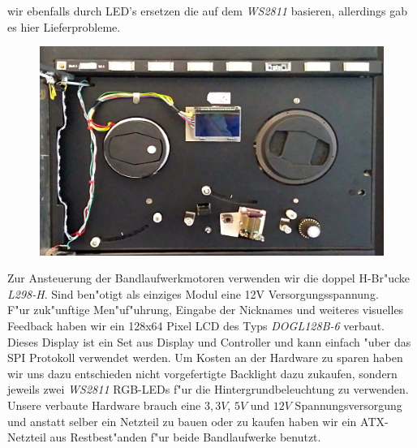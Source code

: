 \documentclass[a4paper]{article}
\begin{document}
    wir ebenfalls durch LED's ersetzen die auf dem \textit{WS2811} basieren,
    allerdings gab es hier Lieferprobleme.\\
    \begin{figure}
      \centering
      \label{figure:Bandlaufwerke}
      \includegraphics[scale=0.075]{Frontansicht.jpg}
    \end{figure}
    Zur Ansteuerung der Bandlaufwerkmotoren verwenden wir die doppel H-Br"ucke
    \textit{L298-H}. Sind ben"otigt als einziges Modul eine 12V
    Versorgungsspannung.\\
    F"ur zuk"unftige Men"uf"uhrung, Eingabe der Nicknames und weiteres
    visuelles Feedback haben wir ein 128x64 Pixel LCD des Typs
    \textit{DOGL128B-6} verbaut. Dieses Display ist ein Set aus Display und
    Controller und kann einfach "uber das SPI Protokoll verwendet werden. Um
    Kosten an der Hardware zu sparen haben wir uns dazu entschieden nicht
    vorgefertigte Backlight dazu zukaufen, sondern jeweils zwei \textit{WS2811}
    RGB-LEDs f"ur die Hintergrundbeleuchtung zu verwenden.\\
    Unsere verbaute Hardware brauch eine \( 3,3V \), \( 5V \) und \( 12V \)
    Spannungsversorgung und anstatt selber ein Netzteil zu bauen oder zu kaufen
    haben wir ein ATX-Netzteil aus Restbest"anden f"ur beide Bandlaufwerke
    benutzt.
\end{document}
